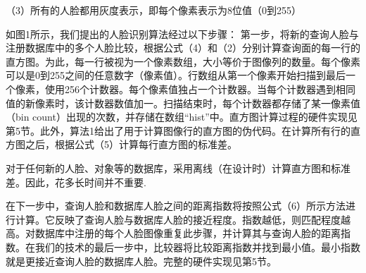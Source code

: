 （3）所有的人脸都用灰度表示，即每个像素表示为8位值（0到255）

如图1所示，我们提出的人脸识别算法经过以下步骤：
第一步，将新的查询人脸与注册数据库中的多个人脸比较，根据公式（4）和（2）分别计算查询面的每一行的直方图。为此，每一行被视为一个像素数组，大小等价于图像列的数量。每个像素可以是0到255之间的任意数字（像素值）。行数组从第一个像素开始扫描到最后一个像素，使用256个计数器。每个像素值独占一个计数器。当每个计数器遇到相同值的新像素时，该计数器数值加一。扫描结束时，每个计数器都存储了某一像素值（bin count）出现的次数，并存储在数组“hist”中。直方图计算过程的硬件实现见第5节。此外，算法1给出了用于计算图像行的直方图的伪代码。在计算所有行的直方图之后，根据公式（5）计算每行直方图的标准差。

对于任何新的人脸、对象等的数据库，采用离线（在设计时）计算直方图和标准差。因此，花多长时间并不重要.

在下一步中，查询人脸和数据库人脸之间的距离指数将按照公式（6）所示方法进行计算。它反映了查询人脸与数据库人脸的接近程度。指数越低，则匹配程度越高。对数据库中注册的每个人脸图像重复此步骤，并计算其与查询人脸的距离指数。在我们的技术的最后一步中，比较器将比较距离指数并找到最小值。最小指数就是更接近查询人脸的数据库人脸。完整的硬件实现见第5节。

